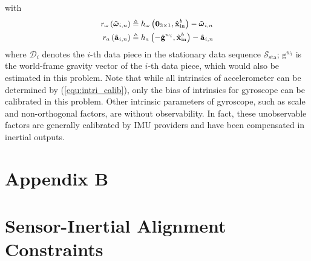 \documentclass[lettersize,journal,twoside]{IEEEtran}
\newcommand\bsm[1]{\boldsymbol{\mathrm{#1}}}
\begin{document}
with
\begin{equation}
\small
\begin{aligned}
r_{\omega}\left( \tilde{\bsm{\omega}}_{i,n}\right) &\triangleq
h_\omega\left( \bsm{0}_{3\times 1},\hat{\bsm{x}}_{\mathrm{in}}^b\right) 
-\tilde{\bsm{\omega}}_{i,n}
\\
r_{a}\left( \tilde{\bsm{a}}_{i,n}\right) &\triangleq
h_a\left( -\hat{\bsm{g}}^{w_i},\hat{\bsm{x}}_{\mathrm{in}}^b\right) 
-\tilde{\bsm{a}}_{i,n}
\end{aligned}
\end{equation}
where $\mathcal{D}_{i}$ denotes the $i$-th data piece in the stationary data sequence $\mathcal{S}_{\mathrm{sta}}$; $\bsm{g}^{w_i}$ is the world-frame gravity vector of the $i$-th data piece, which would also be estimated in this problem.
Note that while all intrinsics of accelerometer can be determined by (\ref{equ:intri_calib}), only the bias of intrinsics for gyroscope can be calibrated in this problem. Other intrinsic parameters of gyroscope, such as scale and non-orthogonal factors, are without observability.
In fact, these unobservable factors are generally calibrated by IMU providers and have been compensated in inertial outputs.


\section*{Appendix B}
\section*{Sensor-Inertial Alignment Constraints}
\label{sect:app_alignment}
\end{document}
